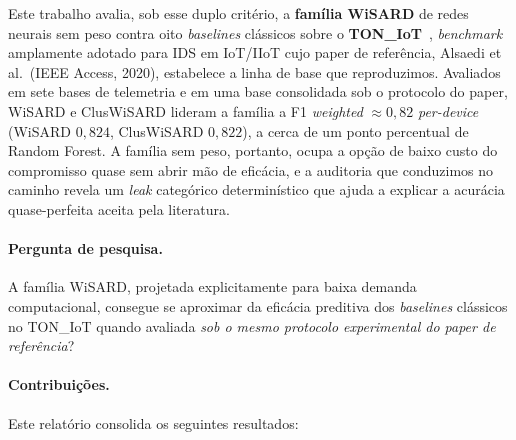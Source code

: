 Este trabalho avalia, sob esse duplo critério, a \textbf{família WiSARD}
de redes neurais sem peso contra oito \emph{baselines} clássicos sobre o
\textbf{TON\_IoT}~\cite{alsaedi2020toniot}, \emph{benchmark} amplamente
adotado para IDS em IoT/IIoT cujo paper de referência, Alsaedi et al.\
(IEEE Access, 2020), estabelece a linha de base que reproduzimos.
Avaliados em sete bases de telemetria e em uma base consolidada sob o
protocolo do paper, WiSARD e ClusWiSARD lideram a família a
F1 \emph{weighted} $\approx 0{,}82$ \emph{per-device} (WiSARD $0{,}824$,
ClusWiSARD $0{,}822$), a cerca de um ponto percentual de Random Forest.
A família sem peso, portanto, ocupa a opção de baixo custo do
compromisso quase sem abrir mão de eficácia, e a auditoria que
conduzimos no caminho revela um \emph{leak} categórico determinístico
que ajuda a explicar a acurácia quase-perfeita aceita pela literatura.

\paragraph{Pergunta de pesquisa.} A família WiSARD, projetada
explicitamente para baixa demanda computacional, consegue se aproximar
da eficácia preditiva dos \emph{baselines} clássicos no TON\_IoT
quando avaliada \emph{sob o mesmo protocolo experimental do paper de
referência}?

\paragraph{Contribuições.} Este relatório consolida os seguintes
resultados:

